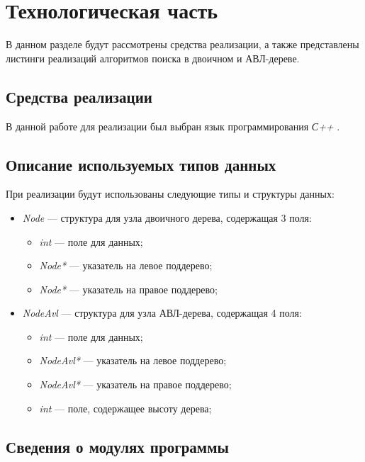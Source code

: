 \chapter{Технологическая часть}

В данном разделе будут рассмотрены средства реализации, а также представлены листинги реализаций алгоритмов поиска в двоичном и АВЛ-дереве.

\section{Средства реализации}

В данной работе для реализации был выбран язык программирования \textit{С++} \cite{cpp}. 

\section{Описание используемых типов данных}

При реализации будут использованы следующие типы и структуры данных:
\begin{itemize}[label=---]
	\item \textit{Node} --- структура для узла двоичного дерева, содержащая 3 поля:
	\begin{itemize}
		\item \textit{int} --- поле для данных;
		\item \textit{Node*} --- указатель на левое поддерево;
		\item \textit{Node*} --- указатель на правое поддерево;
	\end{itemize}
	\item \textit{NodeAvl} --- структура для узла АВЛ-дерева, содержащая 4 поля:
	\begin{itemize}
		\item \textit{int} --- поле для данных;
		\item \textit{NodeAvl*} --- указатель на левое поддерево;
		\item \textit{NodeAvl*} --- указатель на правое поддерево;
		\item \textit{int} --- поле, содержащее высоту дерева;
	\end{itemize}
\end{itemize}

\newpage
\section{Сведения о модулях программы}

